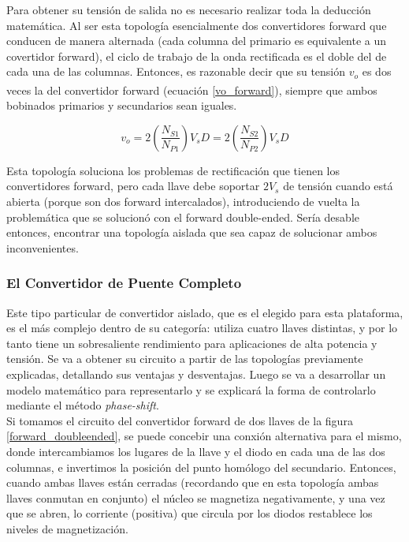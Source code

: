 Para obtener su tensión de salida no es necesario realizar toda la deducción matemática. Al ser esta topología esencialmente dos convertidores forward que conducen de manera alternada (cada columna del primario es equivalente a un covertidor forward), el ciclo de trabajo de la onda rectificada es el doble del de cada una de las columnas. Entonces, es razonable decir que su tensión $v_o$ es dos veces la del convertidor forward (ecuación \ref{vo_forward})\textsuperscript{\cite{PotenciaHart}}, siempre que ambos bobinados primarios y secundarios sean iguales.

\begin{equation}\label{vo_pushpull}
    \boxed{
        v_o = 2\left(\frac{N_{S1}}{N_{P1}}\right)V_sD = 2\left(\frac{N_{S2}}{N_{P2}}\right)V_sD
    }
\end{equation}

Esta topología soluciona los problemas de rectificación que tienen los convertidores forward, pero cada llave debe soportar $2V_s$ de tensión cuando está abierta (porque son dos forward intercalados), introduciendo de vuelta la problemática que se solucionó con el forward double-ended. Sería desable entonces, encontrar una topología aislada que sea capaz de solucionar ambos inconvenientes.\\

\subsubsection{El Convertidor de Puente Completo}

Este tipo particular de convertidor aislado, que es el elegido para esta plataforma, es el más complejo dentro de su categoría: utiliza cuatro llaves distintas, y por lo tanto tiene un sobresaliente rendimiento para aplicaciones de alta potencia y tensión. Se va a obtener su circuito a partir de las topologías previamente explicadas, detallando sus ventajas y desventajas. Luego se va a desarrollar un modelo matemático para representarlo y se explicará la forma de controlarlo mediante el método \textit{phase-shift}.\\

Si tomamos el circuito del convertidor forward de dos llaves de la figura \ref{forward_doubleended}, se puede concebir una conxión alternativa para el mismo, donde intercambiamos los lugares de la llave y el diodo en cada una de las dos columnas, e invertimos la posición del punto homólogo del secundario. Entonces, cuando ambas llaves están cerradas (recordando que en esta topología ambas llaves conmutan en conjunto) el núcleo se magnetiza negativamente, y una vez que se abren, lo corriente (positiva) que circula por los diodos restablece los niveles de magnetización.\\


